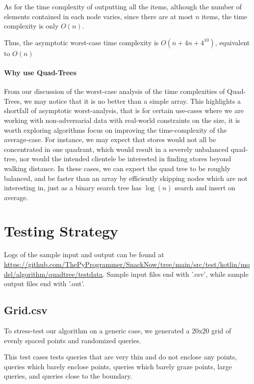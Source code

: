 \documentclass[12pt]{article}
\begin{document}
{As for the time complexity of outputting all the items, although the number of elements contained in each node varies, since there are at most $n$ items, the time complexity is only $O(n)$.

Thus, the asymptotic worst-case time complexity is $O(n + 4n + 4^{10})$, equivalent to $O(n)$

\paragraph{Why use Quad-Trees}

From our discussion of the worst-case analysis of the time complexities of Quad-Trees, we may notice that it is no better than a simple array. This highlights a shortfall of asymptotic worst-analysis, that is for certain use-cases where we are working with non-adversarial data with real-world constraints on the size, it is worth exploring algorithms focus on improving the time-complexity of the average-case. For instance, we may expect that stores would not all be concentrated in one quadrant, which would result in a severely unbalanced quad-tree, nor would the intended clientele be interested in finding stores beyond walking distance. In these cases, we can expect the quad tree to be roughly balanced, and be faster than an array by efficiently skipping nodes which are not interesting in, just as a binary search tree has $\log(n)$ search and insert on average.


\section{Testing Strategy}

Logs of the sample input and output can be found at \url{https://github.com/ThePyProgrammer/SnackNow/tree/main/src/test/kotlin/model/algorithm/quadtree/testdata}. Sample input files end with '.csv', while sample output files end with '.out'.


\subsection{Grid.csv}

To stress-test our algorithm on a generic case, we generated a 20x20 grid of evenly spaced points and randomized queries. 

This test cases tests queries that are very thin and do not enclose any points, queries which barely enclose points, queries which barely graze points, large queries, and queries close to the boundary.

}
\end{document}
